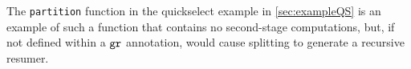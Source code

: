 \begin{abstrsyn}
The \texttt{partition} function in the quickselect example in
\ref{sec:exampleQS} is an example of such a function that contains no
second-stage computations, but, if not defined within a ${\tt gr}$
annotation, would cause splitting to generate a recursive resumer.

\end{abstrsyn}



